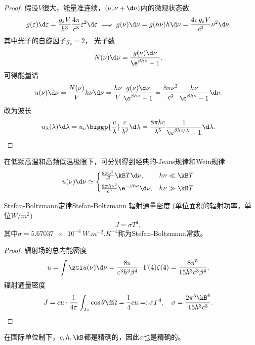 \begin{proof}
	假设$V$很大，能量准连续，$(\nu,\nu+\d\nu)$内的微观状态数
	\[
		g(\varepsilon)\d\varepsilon=\frac{g_sV}{h^3}\frac{4\pi}{c^3}\varepsilon^2\d\varepsilon\implies g(\nu)\d\nu=g(h\nu)h\d\nu=\frac{4\pi g_sV}{c^3}\nu^2\d\nu.
	\]
	其中光子的自旋因子$g_s=2$，
	光子数
	\[
		N(\nu)\d\nu=\frac{g(\nu)\d\nu}{\e^{\beta h\nu}-1}.
	\]
	可得能量谱
	\[
		u(\nu)\d\nu=\frac{N(\nu)}Vh\nu\d\nu=\frac{h\nu}V\frac{g(\nu)\d\nu}{\e^{\beta h\nu}-1}=\frac{8\pi\nu^2}{c^3}\frac{h\nu}{\e^{\beta h\nu}-1}\d\nu.
	\]
	改为波长
	\[
		u_\lambda(\lambda)\d\lambda=u_\nu\biggp{\frac c\lambda}\frac c{\lambda^2}\d\lambda=\frac{8\pi hc}{\lambda^5}\frac1{\e^{\beta hc/\lambda}-1}\d\lambda.
		\qedhere
	\]
\end{proof}

\begin{corollary}
	在低频高温和高频低温极限下，可分别得到经典的\Rayl-Jeans规律和Wein规律
	\[
		u(\nu)\d\nu\simeq
		\begin{cases}
			\frac{8\pi\nu^2}{c^3}\kB T\d\nu,&h\nu\ll\kB T\\[1ex]
			\frac{8\pi h\nu^3}{c^3}\e^{-\beta h\nu}\d\nu,&h\nu\gg\kB T
		\end{cases}
	\]
\end{corollary}

\begin{theorem}
	{Stefan-Boltzmann定律}{Stefan-Boltzmann}
	辐射通量密度
	(单位面积的辐射功率，单位$\si{W/m^2}$)
	\begin{equation}
		J=\sigma T^4,
	\end{equation}
	其中$\sigma=\SI{5.67037e-8}{W.m^{-2}.K^{-4}}$称为Stefan-Boltzmann常数。
\end{theorem}

\begin{proof}
	辐射场的总内能密度
	\[
		u=\int\zti u(\nu)\d\nu=\frac{8\pi}{c^3h^3\beta^4}\cdot\Gamma(4)\zeta(4)=\frac{8\pi^5}{15h^3c^3\beta^4}.
	\]
	辐射通量密度
	\[
		J=cu\cdot\frac1{4\pi}\int_{2\pi}\cos\theta\d\Omega
		=\frac14cu=:\sigma T^4,
		\quad
		\sigma=\frac{2\pi^5\kB^4}{15h^3c^3}.
		\qedhere
	\]
\end{proof}

\begin{remark}
	在国际单位制下，$c,h,\kB$都是精确的，因此$\sigma$也是精确的。
\end{remark}

